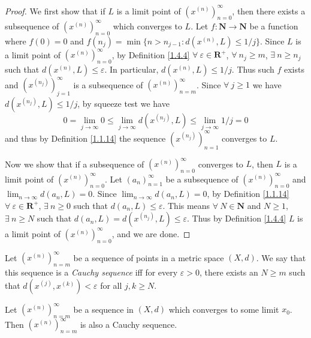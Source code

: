 \begin{proof}
    We first show that if \(L\) is a limit point of \((x^{(n)})_{n = 0}^\infty\), then there exists a subsequence of \((x^{(n)})_{n = 0}^\infty\) which converges to \(L\).
    Let \(f : \mathbf{N} \to \mathbf{N}\) be a function where \(f(0) = 0\) and \(f(n_j) = \min\{n > n_{j - 1} : d(x^{(n)}, L) \leq 1 / j\}\).
    Since \(L\) is a limit point of \((x^{(n)})_{n = 0}^\infty\), by Definition \ref{1.4.4} \(\forall\ \varepsilon \in \mathbf{R}^+\), \(\forall\ n_j \geq m\), \(\exists\ n \geq n_j\) such that \(d(x^{(n)}, L) \leq \varepsilon\).
    In particular, \(d(x^{(n)}, L) \leq 1 / j\).
    Thus such \(f\) exists and \((x^{(n_j)})_{j = 1}^\infty\) is a subsequence of \((x^{(n)})_{n = m}^\infty\).
    Since \(\forall\ j \geq 1\) we have \(d(x^{(n_j)}, L) \leq 1 / j\), by squeeze test we have
    \[
        0 = \lim_{j \to \infty} 0 \leq \lim_{j \to \infty} d(x^{(n_j)}, L) \leq \lim_{j \to \infty} 1 / j = 0
    \]
    and thus by Definition \ref{1.1.14} the sequence \((x^{(n_j)})_{n = 1}^\infty\) converges to \(L\).

    Now we show that if a subsequence of \((x^{(n)})_{n = 0}^\infty\) converges to \(L\), then \(L\) is a limit point of \((x^{(n)})_{n = 0}^\infty\).
    Let \((a_n)_{n = 1}^\infty\) be a subsequence of \((x^{(n)})_{n = 0}^\infty\) and \(\lim_{n \to \infty} d(a_n, L) = 0\).
    Since \(\lim_{n \to \infty} d(a_n, L) = 0\), by Definition \ref{1.1.14} \(\forall\ \varepsilon \in \mathbf{R}^+\), \(\exists\ n \geq 0\) such that \(d(a_n, L) \leq \varepsilon\).
    This means \(\forall\ N \in \mathbf{N}\) and \(N \geq 1\), \(\exists\ n \geq N\) such that \(d(a_n, L) = d(x^{(n_j)}, L) \leq \varepsilon\).
    Thus by Definition \ref{1.4.4} \(L\) is a limit point of \((x^{(n)})_{n = 0}^\infty\), and we are done.
\end{proof}

\begin{definition}\label{1.4.6}
    Let \((x^{(n)})_{n = m}^\infty\) be a sequence of points in a metric space \((X, d)\).
    We say that this sequence is a \emph{Cauchy sequence} iff for every \(\varepsilon > 0\), there exists an \(N \geq m\) such that \(d(x^{(j)}, x^{(k)}) < \varepsilon\) for all \(j, k \geq N\).
\end{definition}

\begin{lemma}\label{1.4.7}
    Let \((x^{(n)})_{n = m}^\infty\) be a sequence in \((X, d)\) which converges to some limit \(x_0\).
    Then \((x^{(n)})_{n = m}^\infty\) is also a Cauchy sequence.
\end{lemma}

